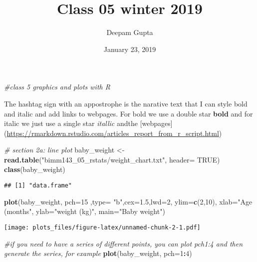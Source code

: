 \documentclass[]{article}
\title{Class 05 winter 2019}
\author{Deepam Gupta}
\date{January 23, 2019}
\newenvironment{Shaded}{\begin{snugshade}}{\end{snugshade}}
\newcommand{\KeywordTok}[1]{\textcolor[rgb]{0.13,0.29,0.53}{\textbf{#1}}}
\newcommand{\DataTypeTok}[1]{\textcolor[rgb]{0.13,0.29,0.53}{#1}}
\newcommand{\DecValTok}[1]{\textcolor[rgb]{0.00,0.00,0.81}{#1}}
\newcommand{\FloatTok}[1]{\textcolor[rgb]{0.00,0.00,0.81}{#1}}
\newcommand{\StringTok}[1]{\textcolor[rgb]{0.31,0.60,0.02}{#1}}
\newcommand{\CommentTok}[1]{\textcolor[rgb]{0.56,0.35,0.01}{\textit{#1}}}
\newcommand{\OtherTok}[1]{\textcolor[rgb]{0.56,0.35,0.01}{#1}}
\newcommand{\OperatorTok}[1]{\textcolor[rgb]{0.81,0.36,0.00}{\textbf{#1}}}
\newcommand{\NormalTok}[1]{#1}
\begin{document}
\maketitle

\begin{Shaded}
\begin{Highlighting}[]
\CommentTok{#class 5 graphics and plots with R}
\end{Highlighting}
\end{Shaded}

The hashtag sign with an appostrophe is the narative text that I can
style bold and italic and add links to webpages. For bold we use a
double star \textbf{bold} and for italic we just use a single star
\emph{itallic} andthe {[}webpages{]}
(\url{https://rmarkdown.rstudio.com/articles_report_from_r_script.html})

\begin{Shaded}
\begin{Highlighting}[]
\CommentTok{# section 2a: line plot}
\NormalTok{baby_weight <-}\StringTok{ }\KeywordTok{read.table}\NormalTok{(}\StringTok{"bimm143_05_rstats/weight_chart.txt"}\NormalTok{, }\DataTypeTok{header=} \OtherTok{TRUE}\NormalTok{)}
\KeywordTok{class}\NormalTok{(baby_weight)}
\end{Highlighting}
\end{Shaded}

\begin{verbatim}
## [1] "data.frame"
\end{verbatim}

\begin{Shaded}
\begin{Highlighting}[]
\KeywordTok{plot}\NormalTok{(baby_weight, }\DataTypeTok{pch=}\DecValTok{15}\NormalTok{ ,}\DataTypeTok{type=} \StringTok{"b"}\NormalTok{,}\DataTypeTok{cex=}\FloatTok{1.5}\NormalTok{,}\DataTypeTok{lwd=}\DecValTok{2}\NormalTok{, }\DataTypeTok{ylim=}\KeywordTok{c}\NormalTok{(}\DecValTok{2}\NormalTok{,}\DecValTok{10}\NormalTok{), }\DataTypeTok{xlab=}\StringTok{"Age (months"}\NormalTok{, }\DataTypeTok{ylab=}\StringTok{"weight (kg)"}\NormalTok{, }\DataTypeTok{main=}\StringTok{"Baby weight"}\NormalTok{)}
\end{Highlighting}
\end{Shaded}

\texttt{[image: plots\_files/figure-latex/unnamed-chunk-2-1.pdf]}

\begin{Shaded}
\begin{Highlighting}[]
\CommentTok{#if you need to have a series of different points, you can plot pch1:4 and then generate the series, for example}
\KeywordTok{plot}\NormalTok{(baby_weight, }\DataTypeTok{pch=}\DecValTok{1}\OperatorTok{:}\DecValTok{4}\NormalTok{)}
\end{Highlighting}
\end{Shaded}
\end{document}
